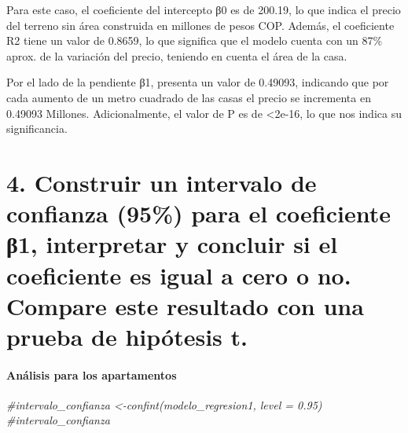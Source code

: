 \documentclass[
]{article}
\newenvironment{Shaded}{\begin{snugshade}}{\end{snugshade}}
\newcommand{\CommentTok}[1]{\textcolor[rgb]{0.56,0.35,0.01}{\textit{#1}}}
\begin{document}
Para este caso, el coeficiente del intercepto β0 es de 200.19, lo que
indica el precio del terreno sin área construida en millones de pesos
COP. Además, el coeficiente R2 tiene un valor de 0.8659, lo que
significa que el modelo cuenta con un 87\% aprox. de la variación del
precio, teniendo en cuenta el área de la casa.

Por el lado de la pendiente β1, presenta un valor de 0.49093, indicando
que por cada aumento de un metro cuadrado de las casas el precio se
incrementa en 0.49093 Millones. Adicionalmente, el valor de P es de
\textless2e-16, lo que nos indica su significancia.

\section{\texorpdfstring{\textbf{4. Construir un intervalo de confianza
(95\%) para el coeficiente β1, interpretar y concluir si el coeficiente
es igual a cero o no. Compare este resultado con una prueba de hipótesis
t.}}{4. Construir un intervalo de confianza (95\%) para el coeficiente β1, interpretar y concluir si el coeficiente es igual a cero o no. Compare este resultado con una prueba de hipótesis t.}}\label{construir-un-intervalo-de-confianza-95-para-el-coeficiente-ux3b21-interpretar-y-concluir-si-el-coeficiente-es-igual-a-cero-o-no.-compare-este-resultado-con-una-prueba-de-hipuxf3tesis-t.}

\paragraph{Análisis para los
apartamentos}\label{anuxe1lisis-para-los-apartamentos}

\begin{Shaded}
\begin{Highlighting}[]
\CommentTok{\#intervalo\_confianza \textless{}{-}confint(modelo\_regresion1, level = 0.95)}
\CommentTok{\#intervalo\_confianza}
\end{Highlighting}
\end{Shaded}
\end{document}

